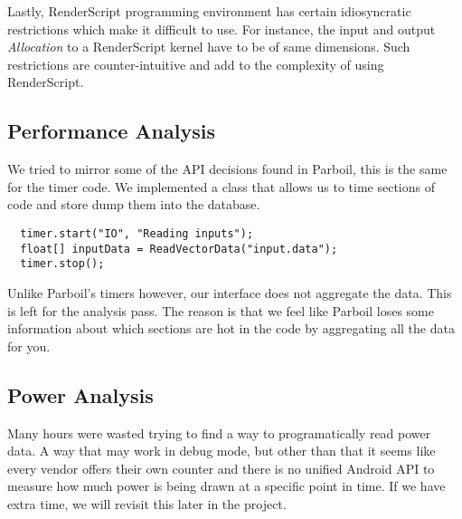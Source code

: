 Lastly, RenderScript programming environment has certain idiosyncratic
restrictions which make it difficult to use. For instance, the input and output
{\em Allocation} to a RenderScript kernel have to be of same dimensions. Such
restrictions are counter-intuitive and add to the complexity of using
RenderScript.

\subsection*{Performance Analysis}

We tried to mirror some of the API decisions found in Parboil, this is the same for the timer code.
We implemented a class that allows us to time sections of code and store dump them into the database.

\begin{verbatim}
  timer.start("IO", "Reading inputs");
  float[] inputData = ReadVectorData("input.data");
  timer.stop();
\end{verbatim}

Unlike Parboil's timers however, our interface does not aggregate the data.
This is left for the analysis pass.
The reason is that we feel like Parboil loses some information about which sections are hot in the
  code by aggregating all the data for you.

\subsection*{Power Analysis}

Many hours were wasted trying to find a way to programatically read power data.
A way that may work in debug mode, but other than that it seems like every vendor offers their own
  counter and there is no unified Android API to measure how much power is being drawn at a 
  specific point in time.
If we have extra time, we will revisit this later in the project.

